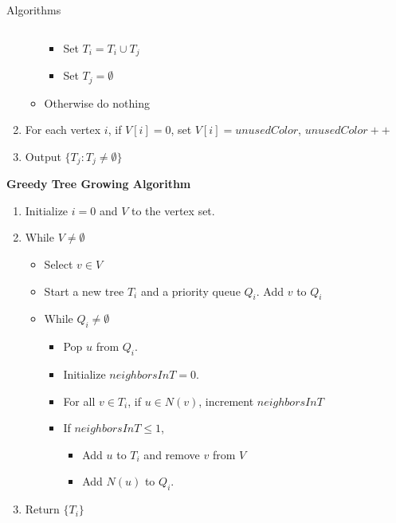 \documentclass[serif,mathserif,final]{beamer}
\begin{document}
\begin{frame}{}
\begin{columns}[t]
\begin{column}{0.49\linewidth}
\begin{block}{\Huge Algorithms}
\begin{columns}[t]
\begin{column}{0.49\linewidth}
\begin{framed}
\begin{enumerate}
\begin{itemize}
\begin{itemize}
\item Set $T_i=T_i\cup T_j$
\item Set $T_j=\emptyset$
\end{itemize}
\item Otherwise do nothing
\end{itemize}
\item For each vertex $i$, if $V[i]=0$, set $V[i]=unusedColor$, $unusedColor++$
\item Output $\{T_j:T_j\neq\emptyset\}$
\end{enumerate}
\end{framed}

\begin{framed}
\noindent\textbf{Greedy Tree Growing Algorithm} %
\begin{enumerate}
\item Initialize $i=0$ and $V$ to the vertex set.
\item While $V\neq\emptyset$
\begin{itemize}
\item Select $v\in V$
\item Start a new tree $T_i$ and a priority queue $Q_i$. Add $v$ to $Q_i$
\item While $Q_i\neq\emptyset$
\begin{itemize}
\item Pop $u$ from $Q_i$.
\item Initialize $neighborsInT=0$.
\item For all $v\in T_i$, if $u\in N(v)$, increment $neighborsInT$
\item If $neighborsInT\le1$,
\begin{itemize}
\item Add $u$ to $T_i$ and remove $v$ from $V$
\item Add $N(u)$ to $Q_i$.
\end{itemize}
\end{itemize}
\end{itemize}
\item Return $\{T_i\}$
\end{enumerate}
\end{framed}

			\end{column}
			\begin{column}{0.49\linewidth}


\end{column}
\end{columns}
\end{block}
\end{column}
\end{columns}
\end{frame}
\end{document}
